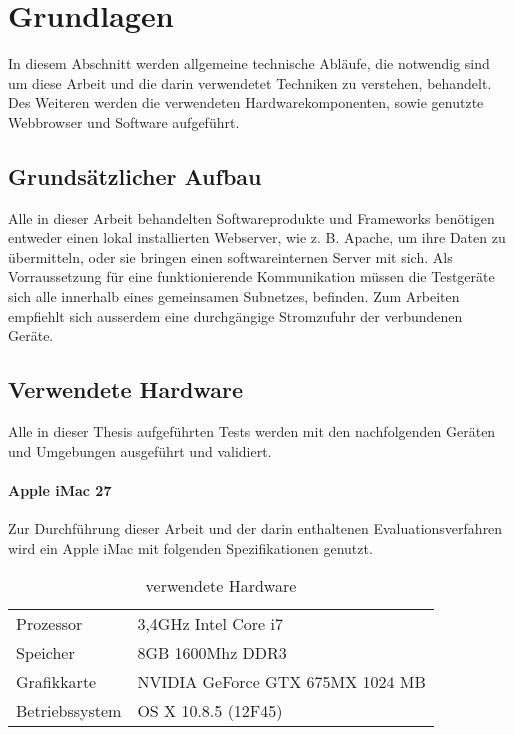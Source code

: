 \chapter{Grundlagen}
In diesem Abschnitt werden allgemeine technische Abläufe, die notwendig sind um diese Arbeit und die darin verwendetet Techniken zu verstehen, behandelt. Des Weiteren werden die verwendeten Hardwarekomponenten, sowie genutzte \Gls{Webbrowser} und Software aufgeführt.

	\section{Grundsätzlicher Aufbau}
	Alle in dieser Arbeit behandelten Softwareprodukte und \Gls{Framework}s benötigen entweder einen lokal installierten Webserver, wie z. B. \Gls{Apache}, um ihre Daten zu übermitteln, oder sie bringen einen softwareinternen Server mit sich. Als Vorraussetzung für eine funktionierende Kommunikation müssen die Testgeräte sich alle innerhalb eines gemeinsamen \Gls{Subnetz}es, befinden. Zum Arbeiten empfiehlt sich ausserdem eine durchgängige Stromzufuhr der verbundenen Geräte.
	
	

	

	
	\pagebreak
	\section{Verwendete Hardware}
	Alle in dieser Thesis aufgeführten Tests werden mit den nachfolgenden Geräten und Umgebungen ausgeführt und validiert.
	
	\subsubsection{Apple iMac 27\texttt\dq}
	Zur Durchführung dieser Arbeit und der darin enthaltenen Evaluationsverfahren wird ein Apple iMac mit folgenden 				Spezifikationen genutzt.
	
	\begin{table}[H]
	 \vspace{-20pt}
 		\centering
			\begin{tabular}{| p{4cm} | p{8cm}  |}
			\hline
				Prozessor			&	3,4GHz Intel Core i7 \\
				Speicher			&	8GB 1600Mhz DDR3\\
				Grafikkarte		&	NVIDIA GeForce GTX 675MX 1024 MB\\
				Betriebssystem		&	OS X 10.8.5 (12F45)\\

				\hline
				\end{tabular}
			\caption{verwendete Hardware}
	\end{table}

